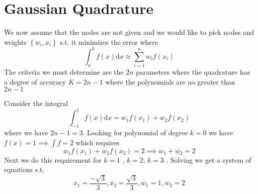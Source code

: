 
\section{Gaussian Quadrature}

We now assume that the nodes are not given and we would like to pick nodes and weights 
\(\left\{ w_i, x_i \right\} \) s.t. it minimizes the error where 
\[
    \int_{a}^{b} f(x) \mathrm{d}x  \approx  \sum_{i=1}^{n} w_i f(x_i)  
\]
The criteria we must determine are the \(2n\) parameters where the quadrature has a 
degree of accuracy \( K=  2n -1 \) where the polynomials are no greater than \(2n-1\)

\begin{eg}
Consider the integral
\[
    \int_{-1}^{1} f(x) \mathrm{d}x  = w_1 f(x_1) + w_2 f(x_2)   
\]
where we have \(2n- 1 =3\). Looking for polynomial of degree \(k=0\) we have
\(f(x) = 1 \implies  \int f = 2\) which requires 
\[
    w_1 f(x_1) + w_2 f(x_2) =2 \implies w_1 + w_2 =2 
\]
Next we do this requirement for \(k=1\)  , \(k=2 \), \(k=3\) . Solving 
we get a system of equations s.t. 
\[
    x_1 = \frac{-\sqrt{3} }{3}, x_2 = \frac{\sqrt{3} }{3}, w_1 =1 , w_2 =2 
\]
\end{eg}
